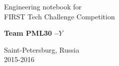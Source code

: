 \begin{titlepage}
\begin{center}
		\LARGE{Engineering notebook for \\ FIRST Tech Challenge Competition}
		
		\vspace{2em}
		
		\bf\fontsize{50}{60}\selectfont Team PML30 --${Y}$ \\  \fontsize{11}{13}\selectfont
		
		\vspace{6em}
		
		\begin{figure}[H]
		\end{figure}
		
		\LARGE\normalfont Saint-Petersburg, Russia	\\ 2015-2016
	\end{center}
\end{titlepage}

\newpage

